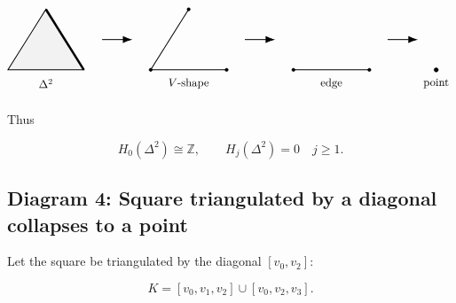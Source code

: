 \documentclass[12pt,a4paper]{article}
\theoremstyle{notespace}
\begin{document}
\[
\begin{tikzpicture}[scale=0.95]
	\coordinate (A) at (0,0);
	\coordinate (B) at (2.5,0);
	\coordinate (C) at (1.25,2);
	
	\fill[gray!10] (A)--(B)--(C)--cycle;
	\draw[thick] (A)--(B)--(C)--cycle;
	\draw[line width=2pt] (B)--(C);
	\node at (1.25,-0.45) {$\Delta^2$};
	
	\draw[-{Latex[length=3mm]},thick] (3.1,1)--(4.1,1);
	
	\begin{scope}[xshift=4.7cm]
		\coordinate (A) at (0,0);
		\coordinate (B) at (2.5,0);
		\coordinate (C) at (1.25,2);
		\draw[thick] (A)--(B);
		\draw[thick] (A)--(C);
		\filldraw (A) circle (1.5pt);
		\filldraw (B) circle (1.5pt);
		\filldraw (C) circle (1.5pt);
		\node at (1.25,-0.45) {\(V\)-shape};
	\end{scope}
	
	\draw[-{Latex[length=3mm]},thick] (7.8,1)--(8.8,1);
	
	\begin{scope}[xshift=9.4cm]
		\coordinate (A) at (0,0);
		\coordinate (B) at (2.5,0);
		\draw[thick] (A)--(B);
		\filldraw (A) circle (1.5pt);
		\filldraw (B) circle (1.5pt);
		\node at (1.25,-0.45) {edge};
	\end{scope}
	
	\draw[-{Latex[length=3mm]},thick] (12.5,1)--(13.5,1);
	
	\begin{scope}[xshift=14.1cm]
		\coordinate (A) at (0,0);
		\filldraw (A) circle (2pt);
		\node at (0,-0.45) {point};
	\end{scope}
\end{tikzpicture}
\]

Thus

\[
H_0(\Delta^2)\cong \mathbb Z,
\qquad
H_j(\Delta^2)=0
\quad
j\geq 1.
\]

\subsection{Diagram 4: Square triangulated by a diagonal collapses to a point}

Let the square be triangulated by the diagonal \([v_0,v_2]\):

\[
K=[v_0,v_1,v_2]\cup [v_0,v_2,v_3].
\]
\end{document}
